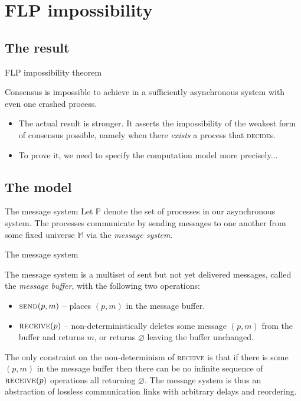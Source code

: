 \documentclass{beamer}
\begin{document}
\section{FLP impossibility}
\subsection{The result}
\begin{frame}{FLP impossibility theorem}
  \begin{theorem}
    Consensus is impossible to achieve in a sufficiently asynchronous system with even one crashed process.
  \end{theorem}

  \begin{itemize}
    \item The actual result is stronger. It asserts the impossibility of the weakest form of consensus possible, namely when there \emph{exists} a process that \textsc{decide}s.
    \item To prove it, we need to specify the computation model more precisely...
  \end{itemize}
\end{frame}

\subsection{The model}
\begin{frame}{The message system}
  Let $\mathbb{P}$ denote the set of processes in our asynchronous system. The processes communicate by sending messages to one another from some fixed universe $\mathbb{M}$ via the \emph{message system}.
\end{frame}

\begin{frame}{The message system}
  \begin{definition}
    The message system is a multiset of sent but not yet delivered messages, called the \emph{message buffer}, with the following two operations:
    \begin{itemize}
      \item $\textsc{send}(p, m)$ -- places $(p,m)$ in the message buffer.
      \item $\textsc{receive}(p)$ -- non-deterministically deletes some message $(p, m)$ from the buffer and returns $m$, or returns $\varnothing$ leaving the buffer unchanged.
    \end{itemize}
  The only constraint on the non-determinism of \textsc{receive} is that if there is some $(p, m)$ in the message buffer then there can be no infinite sequence of $\textsc{receive}(p)$ operations all returning $\varnothing$. The message system is thus an abstraction of lossless communication links with arbitrary delays and reordering.
  \end{definition}
\end{frame}
\end{document}
